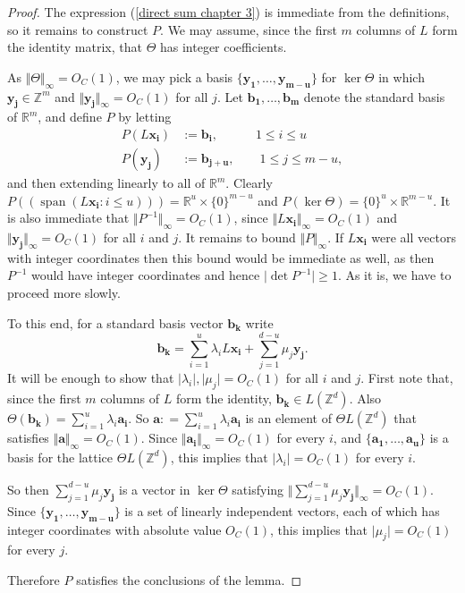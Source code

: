 \documentclass[12pt,a4paper,twoside,reqno]{amsart}
\newcommand{\spn}{\operatorname{span}}
\numberwithin{equation}{section}
\begin{document}
\begin{proof}
The expression (\ref{direct sum chapter 3}) is immediate from the definitions, so it remains to construct $P$. We may assume, since the first $m$ columns of $L$ form the identity matrix, that $\Theta$ has integer coefficients. 

As $\Vert \Theta\Vert_\infty = O_{C}(1)$, we may pick a basis $\{\mathbf{y_1},\dots,\mathbf{y_{m-u}}\}$ for $\ker \Theta$ in which $\mathbf{y_j} \in \mathbb{Z}^m$ and $\Vert \mathbf{y_j}\Vert_\infty = O_{C}(1)$ for all $j$. Let $\mathbf{b_1},\dots,\mathbf{b_m}$ denote the standard basis of $\mathbb{R}^m$, and define $P$ by letting
\begin{align}
\label{definition of P}
P(L\mathbf{x_i}) &:= \mathbf{b_i}, \qquad \quad 1\leqslant i\leqslant u \nonumber \\
P(\mathbf{y_j}) &:= \mathbf{b_{j+u}}, \qquad 1\leqslant j\leqslant m-u,
\end{align}
\noindent and then extending linearly to all of $\mathbb{R}^m$. Clearly $P((\spn(L\mathbf{x_i}:i\leqslant u))) = \mathbb{R}^u \times \{0\}^{m-u}$ and $P(\ker \Theta) = \{0\}^{u} \times \mathbb{R}^{m-u}$. It is also immediate that $\Vert P^{-1} \Vert_\infty = O_{C}(1)$, since $\Vert L\mathbf{x_i}\Vert_\infty = O_{C}(1)$ and $\Vert \mathbf{y_j}\Vert_\infty = O_{C}(1)$ for all $i$ and $j$. It remains to bound $\Vert P\Vert_\infty$. If $L\mathbf{x_i}$ were all vectors with integer coordinates then this bound would be immediate as well, as then $P^{-1}$ would have integer coordinates and hence $\vert \det P^{-1}\vert \geqslant 1$. As it is, we have to proceed more slowly. 

To this end, for a standard basis vector $\mathbf{b_k}$ write \[ \mathbf{b_k} = \sum\limits_{i=1}^u \lambda_i L\mathbf{x_i} + \sum\limits_{j=1}^{d-u}  \mu_j \mathbf{y_j}.\] It will be enough to show that $\vert \lambda_i\vert,\vert \mu_j\vert = O_{C}(1)$ for all $i$ and $j$. First note that, since the first $m$ columns of $L$ form the identity, $\mathbf{b_k} \in L(\mathbb{Z}^d)$. Also $\Theta (\mathbf{b_k}) = \sum_{i=1}^u \lambda_i\mathbf{a_i}$. So $\mathbf{a} : = \sum_{i=1}^u \lambda_i\mathbf{a_i}$ is an element of $\Theta L(\mathbb{Z}^d)$ that satisfies $\Vert \mathbf{a}\Vert_\infty  = O_{C}(1)$. Since $\Vert \mathbf{a_i}\Vert_\infty = O_{C}(1)$ for every $i$, and $\{\mathbf{a_1},\dots,\mathbf{a_u}\}$ is a basis for the lattice $\Theta L(\mathbb{Z}^d)$, this implies that $\vert \lambda_i\vert = O_{C}(1)$ for every $i$. 

So then $\sum_{j=1}^{d-u}  \mu_j \mathbf{y_j}$ is a vector in $\ker \Theta$ satisfying $\Vert \sum_{j=1}^{d-u}  \mu_j \mathbf{y_j}\Vert_\infty = O_{C}(1)$. Since $\{\mathbf{y_1},\dots,\mathbf{y_{m-u}}\}$ is a set of linearly independent vectors, each of which has integer coordinates with absolute value $O_{C}(1)$, this implies that $\vert \mu_j\vert = O_{C}(1)$ for every $j$. 

Therefore $P$ satisfies the conclusions of the lemma.
\end{proof}
\end{document}
